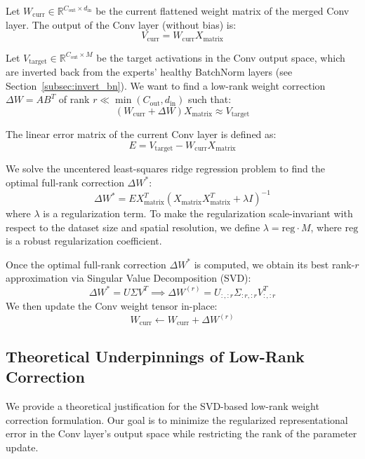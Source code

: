 \documentclass{article}
\theoremstyle{plain}
\theoremstyle{definition}
\theoremstyle{remark}
\begin{document}
Let $W_{\text{curr}} \in \mathbb{R}^{C_{\text{out}} \times d_{\text{in}}}$ be the current flattened weight matrix of the merged Conv layer. The output of the Conv layer (without bias) is:
\begin{equation}
  V_{\text{curr}} = W_{\text{curr}} X_{\text{matrix}}
\end{equation}

Let $V_{\text{target}} \in \mathbb{R}^{C_{\text{out}} \times M}$ be the target activations in the Conv output space, which are inverted back from the experts' healthy BatchNorm layers (see Section~\ref{subsec:invert_bn}). We want to find a low-rank weight correction $\Delta W = A B^T$ of rank $r \ll \min(C_{\text{out}}, d_{\text{in}})$ such that:
\begin{equation}
  (W_{\text{curr}} + \Delta W) X_{\text{matrix}} \approx V_{\text{target}}
\end{equation}

The linear error matrix of the current Conv layer is defined as:
\begin{equation}
  E = V_{\text{target}} - W_{\text{curr}} X_{\text{matrix}}
\end{equation}

We solve the uncentered least-squares ridge regression problem to find the optimal full-rank correction $\Delta W^*$:
\begin{equation}
  \Delta W^* = E X_{\text{matrix}}^T (X_{\text{matrix}} X_{\text{matrix}}^T + \lambda I)^{-1}
\end{equation}
where $\lambda$ is a regularization term. To make the regularization scale-invariant with respect to the dataset size and spatial resolution, we define $\lambda = \text{reg} \cdot M$, where $\text{reg}$ is a robust regularization coefficient.

Once the optimal full-rank correction $\Delta W^*$ is computed, we obtain its best rank-$r$ approximation via Singular Value Decomposition (SVD):
\begin{equation}
  \Delta W^* = U \Sigma V^T \implies \Delta W^{(r)} = U_{:, :r} \Sigma_{:r, :r} V_{:, :r}^T
\end{equation}
We then update the Conv weight tensor in-place:
\begin{equation}
  W_{\text{curr}} \leftarrow W_{\text{curr}} + \Delta W^{(r)}
\end{equation}

\subsection{Theoretical Underpinnings of Low-Rank Correction}
We provide a theoretical justification for the SVD-based low-rank weight correction formulation. Our goal is to minimize the regularized representational error in the Conv layer's output space while restricting the rank of the parameter update.
\end{document}
